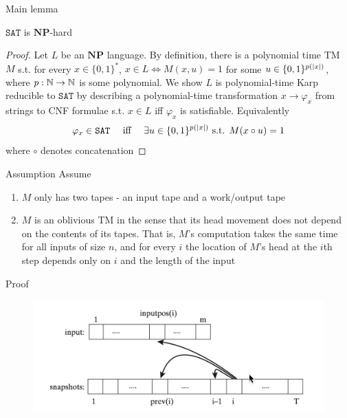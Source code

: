 \documentclass[presentation]{beamer}
\def \NP {\textbf{NP}}
\def \NP {\textbf{NP}}
\def \SAT {\texttt{SAT}}
\begin{document}
\begin{frame}[label={sec:orgfa6aff3}]{Main lemma}
\begin{lemma}[]
\(\SAT\) is \(\NP\)-hard
\end{lemma}

\begin{proof}
Let \(L\) be an \(\NP\) language. By definition, there is a polynomial time TM \(M\) s.t. for
every \(x\in\{0,1\}^*\), \(x\in L\Leftrightarrow M(x,u)=1\) for
some \(u\in\{0,1\}^{p(\abs{x})}\), where \(p:\mathbb{N}\to\mathbb{N}\) is some polynomial. We show \(L\) is
polynomial-time Karp reducible to \(\SAT\) by describing a polynomial-time
transformation \(x\to\varphi_x\) from strings to CNF formulae s.t. \(x\in L\) iff \(\varphi_x\)
is satisfiable. Equivalently
     \begin{equation*}
\varphi_x\in\SAT \quad\text{ iff }\quad\exists u\in\{0,1\}^{p(\abs{x})}
\text{ s.t. }M(x\circ u)=1
     \end{equation*}
where \(\circ\) denotes concatenation
\end{proof}
\end{frame}
\begin{frame}[label={sec:orgc3c963c}]{Assumption}
Assume
\begin{enumerate}
\item \(M\) only has two tapes - an input tape and a work/output tape
\item \(M\) is an oblivious TM in the sense that its head movement does not depend on the contents
of its tapes. That is, \(M\)'s computation takes the same time for all inputs of size \(n\),
and for every \(i\) the location of \(M\)'s head at the \(i\)th step depends only on \(i\)
and the length of the input
\end{enumerate}
\end{frame}
\begin{frame}[label={sec:org1a82783}]{Proof}
\begin{figure}[htbp]
\centering
\includegraphics[width=.8\textwidth]{./2.png}
\label{}
\end{figure}
\end{frame}
\end{document}
